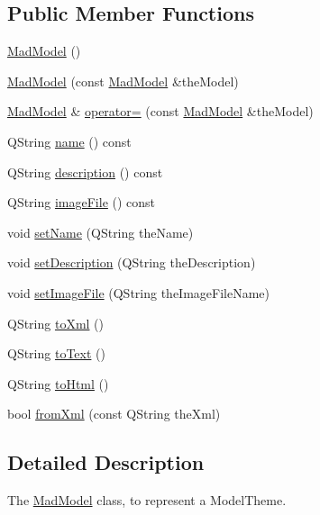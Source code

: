 \subsection*{Public Member Functions}
\begin{DoxyCompactItemize}
\item 
\hyperlink{class_mad_model_af27ca3c9c638a960822924193786d0e9}{Mad\-Model} ()
\item 
\hyperlink{class_mad_model_af8cf7ab044805122243b9153cc56e733}{Mad\-Model} (const \hyperlink{class_mad_model}{Mad\-Model} \&the\-Model)
\item 
\hyperlink{class_mad_model}{Mad\-Model} \& \hyperlink{class_mad_model_a8c064230a0f61bafb7a546a565934585}{operator=} (const \hyperlink{class_mad_model}{Mad\-Model} \&the\-Model)
\item 
Q\-String \hyperlink{class_mad_model_aaad4ceb50f8a4422582c712050469fd7}{name} () const 
\item 
Q\-String \hyperlink{class_mad_model_a424649185054ab1c5e09ce1b7f14bd3b}{description} () const 
\item 
Q\-String \hyperlink{class_mad_model_abd250700ecd6b39bb105bd4700df7026}{image\-File} () const 
\item 
void \hyperlink{class_mad_model_a6fb035d7103acd537ba1e1e2ca61e1e3}{set\-Name} (Q\-String the\-Name)
\item 
void \hyperlink{class_mad_model_afe66211bf0ca450f9bf80556bf54968a}{set\-Description} (Q\-String the\-Description)
\item 
void \hyperlink{class_mad_model_a138bc5e80dda34e870183f7c016c565a}{set\-Image\-File} (Q\-String the\-Image\-File\-Name)
\item 
Q\-String \hyperlink{class_mad_model_a797ce6bb5f6f2798640ef505ed1ee644}{to\-Xml} ()
\item 
Q\-String \hyperlink{class_mad_model_a9fcc10c120e3ee0d947be19fe3e023e5}{to\-Text} ()
\item 
Q\-String \hyperlink{class_mad_model_a45492403d449bbd9dea4e9c567591687}{to\-Html} ()
\item 
bool \hyperlink{class_mad_model_ada33c0eed39499b58d0a886566732607}{from\-Xml} (const Q\-String the\-Xml)
\end{DoxyCompactItemize}


\subsection{Detailed Description}
The \hyperlink{class_mad_model}{Mad\-Model} class, to represent a Model\-Theme. 

